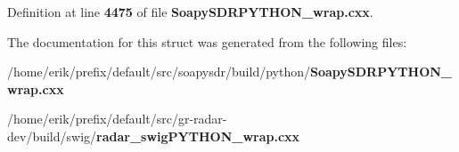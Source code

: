 Definition at line {\bf 4475} of file {\bf Soapy\+S\+D\+R\+P\+Y\+T\+H\+O\+N\+\_\+wrap.\+cxx}.



The documentation for this struct was generated from the following files\+:\begin{DoxyCompactItemize}
\item 
/home/erik/prefix/default/src/soapysdr/build/python/{\bf Soapy\+S\+D\+R\+P\+Y\+T\+H\+O\+N\+\_\+wrap.\+cxx}\item 
/home/erik/prefix/default/src/gr-\/radar-\/dev/build/swig/{\bf radar\+\_\+swig\+P\+Y\+T\+H\+O\+N\+\_\+wrap.\+cxx}\end{DoxyCompactItemize}
